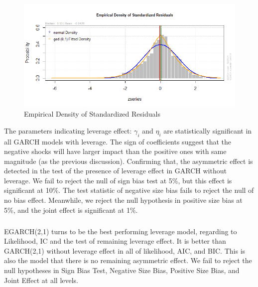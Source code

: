 \documentclass[a4paper]{article}
\begin{document}
\begin{figure}[h]
\centering
\includegraphics[width=0.5\textheight]{ged_distribution.png}
\caption{\label{fig:emp_ged_den}Empirical Density of Standardized Residuals}
\end{figure}

The parameters indicating leverage effect: $\gamma_i$ and $\eta_i$ are statistically significant in all GARCH models with leverage. The sign of coefficients suggest that the negative shocks will have larger impact than the positive ones with same magnitude (as the previous discussion). 
Confirming that, the asymmetric effect is detected in the test of the presence of leverage effect in GARCH without leverage. We fail to reject the null of sign bias test at 5\%, but this effect is significant at 10\%. The test statistic of negative size bias fails to reject the null of no bias effect. Meanwhile, we reject the null hypothesis in positive size bias at 5\%, and the joint effect is significant at 1\%. 

\subparagraph*{}
EGARCH(2,1) turns to be the best performing leverage model, regarding to Likelihood, IC and the test of remaining leverage effect. It is better than GARCH(2,1) without leverage effect in all of likelihood, AIC, and BIC. This is also the model that there is no remaining asymmetric effect. We fail to reject the null hypotheses in Sign Bias Test, Negative Size Bias, Positive Size Bias, and Joint Effect at all levels. 


\end{document}

